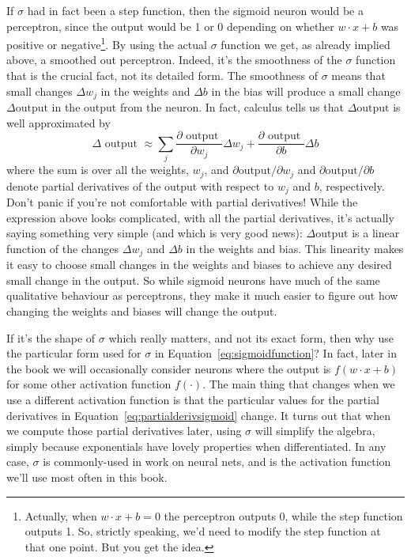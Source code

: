 If $\sigma$ had in fact been a step function, then the sigmoid neuron would be a perceptron, since the output would be 1 or 0 depending on whether $w \cdot x+b$ was positive or negative\footnote{Actually, when  $w \cdot x+b=0$ the perceptron outputs 0, while the step function outputs 1. So, strictly speaking, we'd need to modify the step function at that one point. But you get the idea.}.
 By using the actual $\sigma$ function we get, as already implied above, a smoothed out perceptron. Indeed, it's the smoothness of the $\sigma$ function that is the crucial fact, not its detailed form. The smoothness of $\sigma$ means that small changes $\Delta w_j$ in the weights and $\Delta b$ in the bias will produce a small change $\Delta\textrm{output}$ in the output from the neuron. In fact, calculus tells us that $\Delta\textrm{output}$ is well approximated by 
\begin{equation}
\Delta \textrm { output } \approx \sum_{j} \frac{\partial \textrm { output }}{\partial w_{j}} \Delta w_{j}+\frac{\partial \textrm { output }}{\partial b} \Delta b
\label{eq:partialderivsigmoid}
\end{equation}
where the sum is over all the weights, $w_j$, and $\partial\textrm{output}/\partial w_j$ and $\partial\textrm{output}/\partial b$ denote partial derivatives of the output with respect to $w_j$ and $b$, respectively. Don't panic if you're not comfortable with partial derivatives! While the expression above looks complicated, with all the partial derivatives, it's actually saying something very simple (and which is very good news):  $\Delta\textrm{output}$  is a linear function of the changes $\Delta w_j$ and $\Delta b$ in the weights and bias. This linearity makes it easy to choose small changes in the weights and biases to achieve any desired small change in the output. So while sigmoid neurons have much of the same qualitative behaviour as perceptrons, they make it much easier to figure out how changing the weights and biases will change the output.

If it's the shape of $\sigma$ which really matters, and not its exact form, then why use the particular form used for $\sigma$ in Equation~\ref{eq:sigmoidfunction}? In fact, later in the book we will occasionally consider neurons where the output is $f(w \cdot x+b)$ for some other activation function $f(\cdot)$. The main thing that changes when we use a different activation function is that the particular values for the partial derivatives in Equation~\ref{eq:partialderivsigmoid} change. It turns out that when we compute those partial derivatives later, using $\sigma$ will simplify the algebra, simply because exponentials have lovely properties when differentiated. In any case, $\sigma$ is commonly-used in work on neural nets, and is the activation function we'll use most often in this book.

